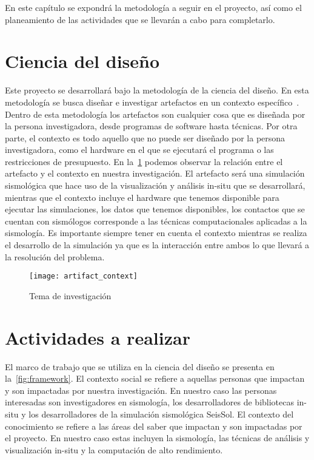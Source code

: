 En este capítulo se expondrá la metodología a seguir en el proyecto, así como el planeamiento de las actividades que se llevarán a cabo para completarlo. 

\section{Ciencia del diseño}
Este proyecto se desarrollará bajo la metodología de la ciencia del diseño. En esta metodología se busca diseñar e investigar artefactos en un contexto específico~\cite{wieringa_design_2014}. Dentro de esta metodología los artefactos son cualquier cosa que es diseñada por la persona investigadora, desde programas de software hasta técnicas. Por otra parte, el contexto es todo aquello que no puede ser diseñado por la persona investigadora, como el hardware en el que se ejecutará el programa o las restricciones de presupuesto.
En la~\cref{fig:artifact} podemos observar la relación entre el artefacto y el contexto en nuestra investigación. El artefacto será una simulación sismológica que hace uso de la visualización y análisis in-situ que se desarrollará, mientras que el contexto incluye el hardware que tenemos disponible para ejecutar las simulaciones, los datos que tenemos disponibles, los contactos que se cuentan con sismólogos corresponde a las técnicas computacionales aplicadas a la sismología. Es importante siempre tener en cuenta el contexto mientras se realiza el desarrollo de la simulación ya que es la interacción entre ambos lo que llevará a la resolución del problema.
\begin{figure}
  \centering
  \texttt{[image: artifact\_context]}
  \caption{Tema de investigación}
  \label{fig:artifact}
\end{figure}

\section{Actividades a realizar}
\label{sec:activities}

El marco de trabajo que se utiliza en la ciencia del diseño se presenta en la~\cref{fig:framework}. El contexto social se refiere a aquellas personas que impactan y son impactadas por nuestra investigación. En nuestro caso las personas interesadas son investigadores en sismología, los desarrolladores de bibliotecas in-situ y los desarrolladores de la simulación sismológica SeisSol. El contexto del conocimiento se refiere a las áreas del saber que impactan y son impactadas por el proyecto. En nuestro caso estas incluyen la sismología, las técnicas de análisis y visualización in-situ y la computación de alto rendimiento.

